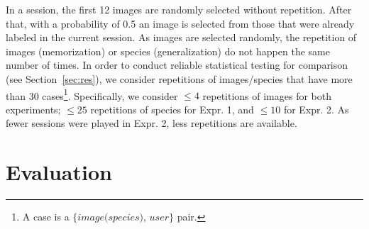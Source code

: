 In a session, the first 12 images are randomly selected without repetition. 
After that, with a probability of 0.5 
an image is selected
from those that were already labeled in the current session. 
%
As images are selected randomly, the repetition of images (memorization) or 
species (generalization) do not happen the same number of times. 
In order to conduct reliable statistical testing for comparison %
(see Section~\ref{sec:res}), we consider repetitions of images/species 
that have more than 30 cases\footnote{A case is a $\{\textit{image(species), user}\}$ pair.}. 
Specifically, we consider $\le 4$ repetitions of images for both experiments; 
$\le 25$ repetitions of species for  Expr. 1, and $\le 10$ for Expr. 2.
As fewer sessions were played in Expr. 2, less repetitions are available. 



\section{Evaluation}
\label{sec:eval}
%

